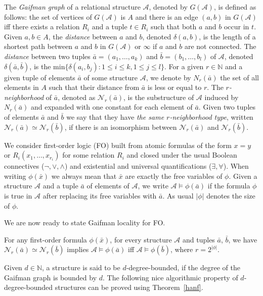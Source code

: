 \documentclass{LMCS}
\newcommand\cA{\ensuremath{{\mathcal A}}\xspace}
\newcommand\cN{\ensuremath{{\mathcal N}}\xspace}
\newcommand\FO{\textup{FO}\xspace}
\begin{document}
The \emph{Gaifman graph} of a relational structure $\cA$, denoted by $G(\cA)$,
is defined as follows: the set of vertices of $G(\cA)$ is $A$ and there is an
edge $(a,b)$ in $G(\cA)$ iff there exists a relation $R_{i}$ and a tuple $t \in
R_{i}$ such that both $a$ and $b$ occur in $t$. Given $a,b \in A$, the
\emph{distance} between $a$ and $b$, denoted $\delta(a,b)$, is the length of a
shortest path between $a$ and $b$ in $G(\cA)$ or $\infty$ if $a$ and $b$ are
not connected. The \emph{distance} between two tuples $\bar a=(a_{1}, \ldots,
a_{k})$ and $\bar b=(b_{1}, \ldots, b_{l})$ of \cA, denoted $\delta(\bar a,
\bar b)$, is the $\text{min} \{ \delta(a_{i}, b_{j}) : 1 \leq i \leq k, 1 \leq
j \leq l \}$. For a given $r\in\mathbb{N}$ and a given tuple of elements $\bar
a$ of some structure $\cA$, we denote by $N_{r}(\bar a)$ the set of all elements in $A$ such
that their distance from $\bar a$ is less or equal to $r$.  The
\emph{$r$-neighborhood} of $\bar a$, denoted as $\cN_{r}(\bar a)$, is the
substructure of \cA induced by $N_{r}(\bar a)$ and expanded with one constant
for each element of $\bar a$. 
Given two tuples of elements $\bar a$ and $\bar
b$ we say that they have \emph{the same $r$-neighborhood type}, written
$\cN_r(\bar a) \simeq \cN_r(\bar b)$, if there is an isomorphism between
$\cN_{r}(\bar a)$ and $\cN_{r}(\bar b)$.

We consider first-order logic (\FO) built from atomic formulas of the form
$x=y$ or $R_{i}(x_{1}, \ldots, x_{r_{i}})$ for some relation $R_{i}$ and closed
under the usual Boolean connectives ($\neg,\vee,\wedge$) and existential and
universal quantifications ($\exists,\forall$).  When writing $\phi(\bar x)$ we
always mean that $\bar x$ are exactly the free variables of $\phi$. Given a
structure $\cA$ and a tuple $\bar a$ of elements of $\cA$, we write $\cA
\models \phi(\bar a)$ if the formula $\phi$ is true in $\cA$ after
replacing its free variables with $\bar a$. As usual $|\phi|$ denotes the size
of $\phi$.

We are now ready to state Gaifman locality for \FO.

\begin{thm}\label{hanf}
  For any first-order formula $\phi(\bar x)$, for every structure $\cA$ and
  tuples $\bar a$, $\bar b$, we have $\cN_r(\bar a) \simeq \cN_r(\bar b)$ implies
  $\cA\models \phi(\bar a)$ iff $\cA\models \phi(\bar b)$, where $r=2^{|\phi|}$.
\end{thm}

Given $d \in \mathbb{N}$, a structure is said to be $d$-degree-bounded, if
the degree of the Gaifman graph is bounded by $d$. The following nice
algorithmic property of $d$-degree-bounded structures can be proved using
Theorem~\ref{hanf}.
\end{document}
